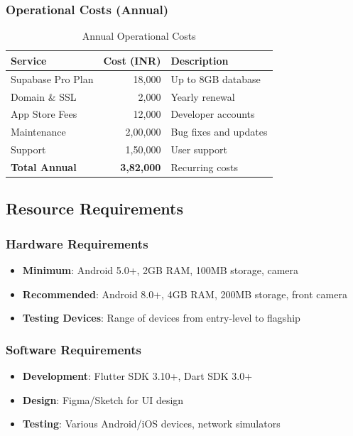 \documentclass[12pt,a4paper]{article}
\begin{document}
\subsubsection{Operational Costs (Annual)}
\begin{table}[H]
\centering
\small
\begin{tabularx}{0.9\textwidth}{|l|r|X|}
\hline
\rowcolor{lightgray}
\textbf{Service} & \textbf{Cost (INR)} & \textbf{Description} \\
\hline
Supabase Pro Plan & 18,000 & Up to 8GB database \\
\hline
Domain \& SSL & 2,000 & Yearly renewal \\
\hline
App Store Fees & 12,000 & Developer accounts \\
\hline
Maintenance & 2,00,000 & Bug fixes and updates \\
\hline
Support & 1,50,000 & User support \\
\hline
\textbf{Total Annual} & \textbf{3,82,000} & Recurring costs \\
\hline
\end{tabularx}
\caption{Annual Operational Costs}
\end{table}

\subsection{Resource Requirements}

\subsubsection{Hardware Requirements}
\begin{itemize}[leftmargin=*, itemsep=0.2em]
    \item \textbf{Minimum}: Android 5.0+, 2GB RAM, 100MB storage, camera
    \item \textbf{Recommended}: Android 8.0+, 4GB RAM, 200MB storage, front camera
    \item \textbf{Testing Devices}: Range of devices from entry-level to flagship
\end{itemize}

\subsubsection{Software Requirements}
\begin{itemize}[leftmargin=*, itemsep=0.2em]
    \item \textbf{Development}: Flutter SDK 3.10+, Dart SDK 3.0+
    \item \textbf{Design}: Figma/Sketch for UI design
    \item \textbf{Testing}: Various Android/iOS devices, network simulators
\end{itemize}
\end{document}
